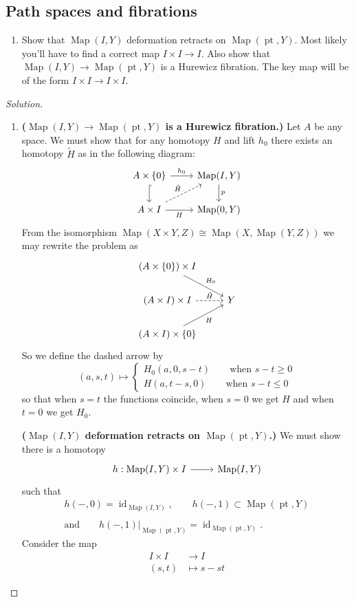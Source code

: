 \documentclass{article}
\numberwithin{equation}{section}
\DeclareMathOperator{\id}{id}
\DeclareMathOperator{\pt}{pt}
\DeclareMathOperator{\Map}{Map}
\begin{document}
\subsection{Path spaces and fibrations}
\begin{exercise}\leavevmode
	\begin{enumerate}[label*=\alph*.]
		\item Show that $\Map(I,Y)$ deformation retracts on $\Map(\pt,Y)$. Most likely you’ll have to find a correct map $I\times I\to I$. Also show that $\Map(I,Y)\to \Map(\pt,Y)$ is a Hurewicz fibration. The key map will be of the form $I \times I \to I \times I$.
	\end{enumerate}
\end{exercise}
\begin{proof}[Solution]\leavevmode
	\begin{enumerate}[label*=\alph*.]
		\item
		
		\textbf{($\Map(I,Y)\to\Map(\pt,Y)$ is a Hurewicz fibration.)} Let $A$ be any space. We must show that for any homotopy $H$ and lift $h_0$ there exists an homotopy $\tilde{H}$ as in the following diagram:
		\[\begin{tikzcd}
			A\times\{0\}\arrow[d,hook]\arrow[r,"h_0"]&\Map(I,Y)\arrow[d,"p"]\\
			A\times I\arrow[ur,dashed,"\tilde{H}"]\arrow[r,"H",swap]&\Map(0,Y)
		\end{tikzcd}\]
		From the isomorphism $\Map(X\times Y,Z)\cong\Map(X,\Map(Y,Z))$ we may rewrite the problem as
		\[\begin{tikzcd}
			(A\times\{0\})\times I\arrow[dr,"H_0"]\\
			(A\times I)\times I\arrow[r,dashed,"\tilde{H}"]&Y\\
			(A\times I)\times \{0\}\arrow[ur,"H",swap]
		\end{tikzcd}\]
		So we define the dashed arrow by
		\[(a,s,t)\mapsto\begin{cases}
			H_0(a,0,s-t)\qquad \text{when }s-t\geq0\\
			H(a,t-s,0)\qquad\text{when }s-t\leq0
		\end{cases}\]
		so that when $s=t$ the functions coincide, when $s=0$ we get $H$ and when $t=0$ we get $H_0$.
		
		\vspace{1cm}
		\textbf{($\Map(I,Y)$ deformation retracts on $\Map(\pt,Y)$.)} We must show there is a homotopy
		\[\begin{tikzcd}
			h:\Map(I,Y)\times I\arrow[r]&\Map(I,Y)
		\end{tikzcd}\]
		such that
		\begin{gather*}
			h(-,0)=\id_{\Map(I,Y)},\qquad h(-,1)\subset\Map(\pt,Y)\\\\ \text{and}\qquad h(-,1)|_{\Map(\pt,Y)}=\id_{\Map(\pt,Y)}.
		\end{gather*}
		Consider the map
		\begin{align*}
			I\times I&\to I\\
			(s,t)&\mapsto s-st
		\end{align*}
		

\end{enumerate}
\end{proof}
\end{document}
